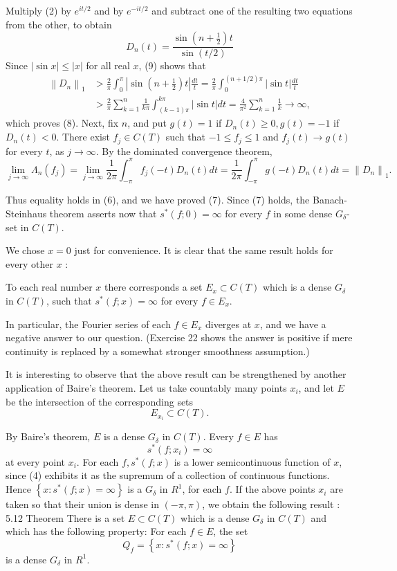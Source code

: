 Multiply (2) by $e^{i t / 2}$ and by $e^{-i t / 2}$ and subtract one of the resulting two equations from the other, to obtain
$$
D_n(t)=\frac{\sin \left(n+\frac{1}{2}\right) t}{\sin (t / 2)}
$$
Since $|\sin x| \leq|x|$ for all real $x$, (9) shows that
$$
\begin{aligned}
\left\|D_n\right\|_1 & >\frac{2}{\pi} \int_0^\pi\left|\sin \left(n+\frac{1}{2}\right) t\right| \frac{d t}{t}=\frac{2}{\pi} \int_0^{(n+1 / 2) \pi}|\sin t| \frac{d t}{t} \\
& >\frac{2}{\pi} \sum_{k=1}^n \frac{1}{k \pi} \int_{(k-1) \pi}^{k \pi}|\sin t| d t=\frac{4}{\pi^2} \sum_{k=1}^n \frac{1}{k} \rightarrow \infty,
\end{aligned}
$$
which proves (8).
Next, fix $n$, and put $g(t)=1$ if $D_n(t) \geq 0, g(t)=-1$ if $D_n(t)<0$. There exist $f_j \in C(T)$ such that $-1 \leq f_j \leq 1$ and $f_j(t) \rightarrow g(t)$ for every $t$, as $j \rightarrow \infty$. By the dominated convergence theorem,
$$
\lim _{j \rightarrow \infty} \Lambda_n\left(f_j\right)=\lim _{j \rightarrow \infty} \frac{1}{2 \pi} \int_{-\pi}^\pi f_j(-t) D_n(t) d t=\frac{1}{2 \pi} \int_{-\pi}^\pi g(-t) D_n(t) d t=\left\|D_n\right\|_1 .
$$

Thus equality holds in (6), and we have proved (7).
Since (7) holds, the Banach-Steinhaus theorem asserts now that $s^*(f ; 0)=\infty$ for every $f$ in some dense $G_\delta$-set in $C(T)$.

We chose $x=0$ just for convenience. It is clear that the same result holds for every other $x$ :

To each real number $x$ there corresponds a set $E_x \subset C(T)$ which is a dense $G_\delta$ in $C(T)$, such that $s^*(f ; x)=\infty$ for every $f \in E_x$.

In particular, the Fourier series of each $f \in E_x$ diverges at $x$, and we have a negative answer to our question. (Exercise 22 shows the answer is positive if mere continuity is replaced by a somewhat stronger smoothness assumption.)

It is interesting to observe that the above result can be strengthened by another application of Baire's theorem. Let us take countably many points $x_i$, and let $E$ be the intersection of the corresponding sets
$$
E_{x_i} \subset C(T) .
$$

By Baire's theorem, $E$ is a dense $G_\delta$ in $C(T)$. Every $f \in E$ has
$$
s^*\left(f ; x_i\right)=\infty
$$
at every point $x_i$.
For each $f, s^*(f ; x)$ is a lower semicontinuous function of $x$, since (4) exhibits it as the supremum of a collection of continuous functions. Hence $\left\{x: s^*(f ; x)=\infty\right\}$ is a $G_\delta$ in $R^1$, for each $f$. If the above points $x_i$ are taken so that their union is dense in $(-\pi, \pi)$, we obtain the following result :
5.12 Theorem There is a set $E \subset C(T)$ which is a dense $G_\delta$ in $C(T)$ and which has the following property: For each $f \in E$, the set
$$
Q_f=\left\{x: s^*(f ; x)=\infty\right\}
$$
is a dense $G_\delta$ in $R^1$.

